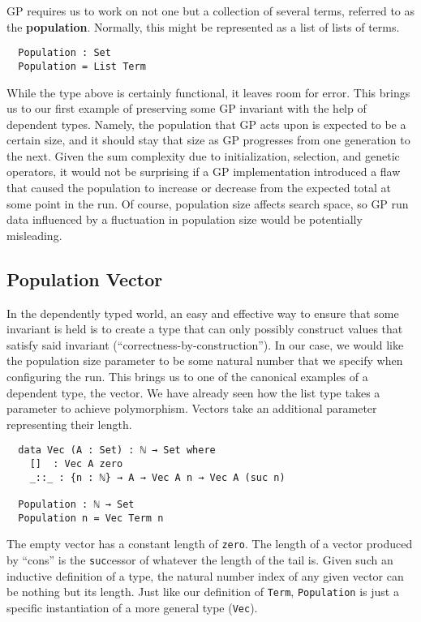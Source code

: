 \documentclass[runningheads,a4paper]{llncs}
\begin{document}
GP requires us to work on not one but a collection of several terms,
referred to as the \textbf{population}. Normally, this might be
represented as a list of lists of terms.

\begin{verbatim}
  Population : Set
  Population = List Term
\end{verbatim}

While the type above is certainly functional, it leaves room for
error. This brings us to our first example of preserving some GP
invariant with the help of dependent types. Namely, the population
that GP acts upon is expected to be a certain size, and it should stay
that size as GP progresses from one generation to the next. Given the
sum complexity due to initialization, selection, and genetic
operators, it would not be surprising if a GP implementation introduced a flaw
that caused the population to increase or decrease from the expected total
at some point in the run. Of course, population size affects search
space, so GP run data influenced by a fluctuation in population size would be
potentially misleading.

\subsection{Population Vector}

In the dependently typed world, an easy and effective way to ensure
that some invariant is held is to create a type that can only possibly
construct values that satisfy said invariant
(``correctness-by-construction''). In our case, we would
like the population size parameter to be some natural number
that we specify when configuring the run. This brings us to one of
the canonical examples of a dependent type, the vector. We have
already seen how the list type takes a parameter to achieve
polymorphism. Vectors take an additional parameter representing their
length.

\begin{verbatim}
  data Vec (A : Set) : ℕ → Set where
    []  : Vec A zero
    _::_ : {n : ℕ} → A → Vec A n → Vec A (suc n)

  Population : ℕ → Set
  Population n = Vec Term n
\end{verbatim}

The empty vector has a constant length of \texttt{zero}. The length of a vector
produced by ``cons'' is the \texttt{suc}cessor of whatever the length of
the tail is. Given such an inductive definition of a type, the natural
number index of any given vector can be nothing but its length. Just
like our definition of \texttt{Term}, \texttt{Population} is just a
specific instantiation of a more general type (\texttt{Vec}).
\end{document}
